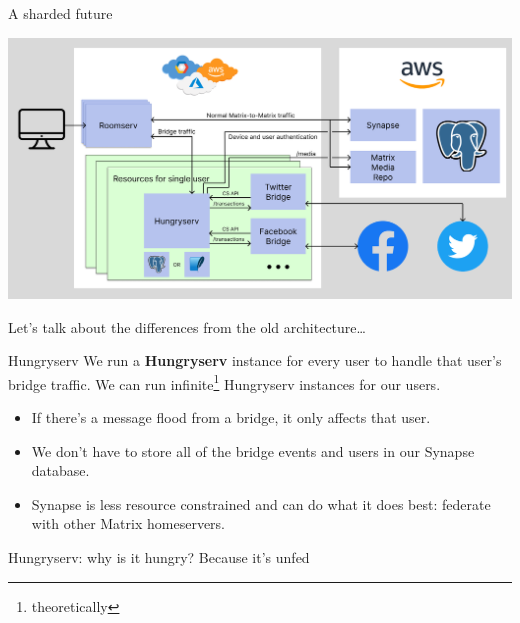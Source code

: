 \documentclass{beeper}
\begin{document}
\begin{frame}{A sharded future}
    \centerline{\includegraphics[width=1.15\textwidth]{images/new-architecture}}

    Let's talk about the differences from the old architecture\ldots
\end{frame}

\begin{frame}{Hungryserv}
    We run a \textbf{Hungryserv} instance for every user to handle that user's
    bridge traffic.
    \pause
    We can run infinite\footnote[frame]{theoretically} Hungryserv instances for
    our users.
    \pause

    \begin{itemize}[<+->]
        \item If there's a message flood from a bridge, it only affects that
            user.
        \item We don't have to store all of the bridge events and users in our
            Synapse database.
        \item Synapse is less resource constrained and can do what it does best:
            federate with other Matrix homeservers.
    \end{itemize}
\end{frame}

\begin{frame}{Hungryserv: why is it hungry?}
    \Large
    Because it's unfed
\end{frame}


\end{document}
